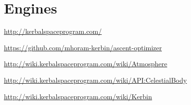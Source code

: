 \documentclass[11pt]{article}
\begin{document}
\section{Engines}

\begin{thebibliography}{Kerbin}

  \url{http://kerbalspaceprogram.com/}

  \url{https://github.com/mhoram-kerbin/ascent-optimizer}

  \url{http://wiki.kerbalspaceprogram.com/wiki/Atmosphere}

  \url{http://wiki.kerbalspaceprogram.com/wiki/API:CelestialBody}

  \url{http://wiki.kerbalspaceprogram.com/wiki/Kerbin}

\end{thebibliography}
\end{document}
